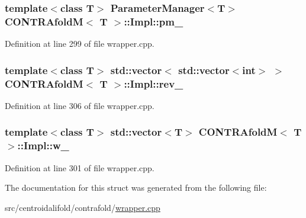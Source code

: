 \hypertarget{struct_c_o_n_t_r_afold_m_1_1_impl_a60c3b1fda2951015e561097906d52032}{
\subsubsection[{pm\+\_\+}]{\setlength{\rightskip}{0pt plus 5cm}template$<$class T$>$ {\bf Parameter\+Manager}$<$T$>$ {\bf C\+O\+N\+T\+R\+Afold\+M}$<$ T $>$\+::Impl\+::pm\+\_\+}}\label{struct_c_o_n_t_r_afold_m_1_1_impl_a60c3b1fda2951015e561097906d52032}


Definition at line 299 of file wrapper.\+cpp.

\hypertarget{struct_c_o_n_t_r_afold_m_1_1_impl_a01416d1629455fa35c6c215f271b49de}{
\subsubsection[{rev\+\_\+}]{\setlength{\rightskip}{0pt plus 5cm}template$<$class T$>$ std\+::vector$<$ std\+::vector$<$int$>$ $>$ {\bf C\+O\+N\+T\+R\+Afold\+M}$<$ T $>$\+::Impl\+::rev\+\_\+}}\label{struct_c_o_n_t_r_afold_m_1_1_impl_a01416d1629455fa35c6c215f271b49de}


Definition at line 306 of file wrapper.\+cpp.

\hypertarget{struct_c_o_n_t_r_afold_m_1_1_impl_a0d3688ca0a9ab1331d4976e92d2e8513}{
\subsubsection[{w\+\_\+}]{\setlength{\rightskip}{0pt plus 5cm}template$<$class T$>$ std\+::vector$<$T$>$ {\bf C\+O\+N\+T\+R\+Afold\+M}$<$ T $>$\+::Impl\+::w\+\_\+}}\label{struct_c_o_n_t_r_afold_m_1_1_impl_a0d3688ca0a9ab1331d4976e92d2e8513}


Definition at line 301 of file wrapper.\+cpp.



The documentation for this struct was generated from the following file\+:\begin{DoxyCompactItemize}
\item 
src/centroidalifold/contrafold/\hyperlink{contrafold_2wrapper_8cpp}{wrapper.\+cpp}\end{DoxyCompactItemize}
